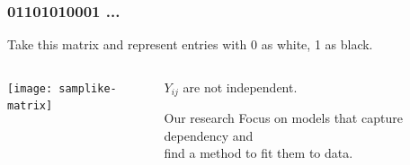 \documentclass[ 10pt]{beamer}
\begin{document}
%
%
%
%
%

\frame
{
\frametitle{01101010001 ...}
Take this matrix and represent entries with 0 as white, 1 as black.
\begin{columns}[T]
\begin{column}[T]{0.35\textwidth}
\texttt{[image: samplike-matrix]}
\end{column}
\pause
\begin{column}[T]{0.65\textwidth}
\vspace{5mm}

$Y_{ij}$ are \alert{not} independent.
\vspace{2mm}

\begin{block}{Our research}
Focus on models that capture dependency and \\
find a method to fit them to data.
\end{block}

\end{column}
\end{columns}





}
\end{document}
